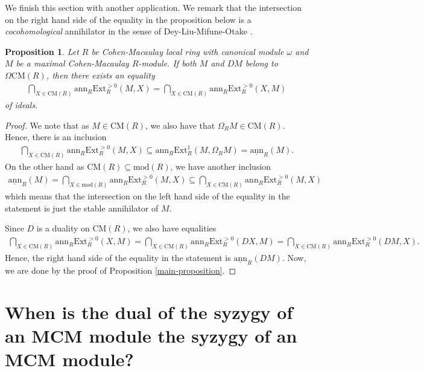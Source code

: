 \documentclass[12pt]{amsart}
\newcommand{\Ext}{\mathrm{Ext}}
\newcommand{\ann}{\mathrm{ann}}
\newcommand{\sann}{\underline{\mathrm{ann}}}
\newcommand{\module}{\mathrm{mod}}
\newcommand{\CM}{\mathrm{CM}}
\newtheorem{proposition}[theorem]{Proposition}
\theoremstyle{definition}
\numberwithin{equation}{theorem}
\begin{document}
We finish this section with another application. We remark that the intersection on the right hand side of the equality in the proposition below is a \textit{cocohomological} annihilator in the sense of Dey-Liu-Mifune-Otake \cite{Dey-Liu-Mifune-Otake}.
\begin{proposition}
    Let $R$ be Cohen-Macaulay local ring with canonical module $\omega$ and $M$ be a maximal Cohen-Macaulay $R$-module. If both $M$ and $DM$ belong to $\Omega \CM(R)$, then there exists an equality
    \begin{align*}
        \bigcap_{X \in \CM(R)} \ann_R \Ext_R^{>0}(M,X) = \bigcap_{X \in \CM(R)} \ann_R \Ext_R^{>0}(X,M)
    \end{align*}
    of ideals.
\end{proposition}
\begin{proof}
    We note that as $M \in \CM(R)$, we also have that $\Omega_RM \in \CM(R)$. Hence, there is an inclusion 
    \begin{align*}
    \bigcap_{X \in \CM(R)} \ann_R \Ext_R^{>0}(M,X) \subseteq \ann_R\Ext_R^1(M, \Omega_R M) = \sann_R(M).
    \end{align*}
    On the other hand as $\CM(R) \subseteq \module(R)$, we have another inclusion 
    \begin{align*}
    \sann_R(M) = \bigcap_{X \in \module(R)} \ann_R \Ext_R^{>0}(M,X) \subseteq \bigcap_{X \in \CM(R)} \ann_R \Ext_R^{>0}(M,X)
    \end{align*}
    which means that the intersection on the left hand side of the equality in the statement is just the stable annihilator of $M$. 
    
    Since $D$ is a duality on $\CM(R)$, we also have equalities
    \begin{align*}
        \bigcap_{X \in \CM(R)} \ann_R \Ext_R^{>0}(X,M) = \bigcap_{X \in \CM(R)} \ann_R \Ext_R^{>0}(DX,M) = \bigcap_{X \in \CM(R)} \ann_R \Ext_R^{>0}(DM,X).
    \end{align*}
    Hence, the right hand side of the equality in the statement is $\sann_R(DM)$. Now, we are done by the proof of Proposition \ref{main-proposition}.
\end{proof}

\section{When is the dual of the syzygy of an MCM module the syzygy of an MCM module?}
\end{document}
